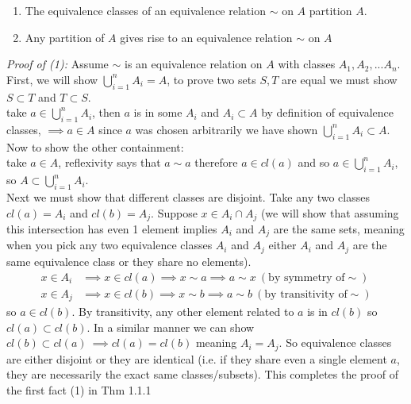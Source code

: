 \begin{theorem}                           \hspace{0.4in}
\begin{enumerate}
    \item The equivalence classes of an equivalence relation $\sim$ on $A$ partition $A$.
    \item Any partition of $A$ gives rise to an equivalence relation $\sim$ on $A$
\end{enumerate}
\steezybreak
\textit{Proof of (1):} Assume $\sim$ is an equivalence relation on $A$ with classes $A_1,A_2,...A_n$. First, we will show $\bigcup_{i=1}^n A_i=A$, to prove two sets $S,T$ are equal we must show $S\subset T$ and $T\subset S$.\steezybreak\\
take $a\in \bigcup_{i=1}^n A_i$, then $a$ is in some $A_i$ and $A_i\subset A$ by definition of equivalence classes, $\implies a \in A$ since $a$ was chosen arbitrarily we have shown $\bigcup_{i=1}^n A_i \subset A$. Now to show the other containment:\steezybreak\\
take $a\in A$, reflexivity says that $a\sim a$ therefore $a\in cl(a)$ and so $a\in \bigcup_{i=1}^n A_i$, so $A\subset \bigcup_{i=1}^n A_i$.\steezybreak\\

Next we must show that different classes are disjoint. Take any two classes $cl(a)=A_i$ and $cl(b)=A_j$. Suppose $x\in A_i\cap A_j$ (we will show that assuming this intersection has even 1 element implies $A_i$ and $A_j$  are the same sets, meaning  when you pick any two equivalence classes $A_i$ and $A_j$ either $A_i$ and $A_j$ are the same equivalence class or they share no elements).
\begin{align}
    x\in A_i &\implies x\in cl(a) \implies x\sim a \implies a\sim x \ (\text{by symmetry of} \sim) \nonumber\\
    x\in A_j &\implies x\in cl(b) \implies x\sim b \implies a\sim b \ (\text{by transitivity of} \sim) \nonumber
\end{align}
so $a\in cl(b)$. By transitivity, any other element related to $a$ is in $cl(b)$ so $cl(a)\subset cl(b)$. In a similar manner we can show $cl(b)\subset cl(a) \ \implies cl(a)=cl(b)$ meaning $A_i=A_j$. So equivalence classes are either disjoint or they are identical (i.e. if they share even a single element $a$, they are necessarily the exact same classes/subsets). This completes the proof of the first fact (1) in Thm 1.1.1 \steezybreak \\


\end{theorem}
